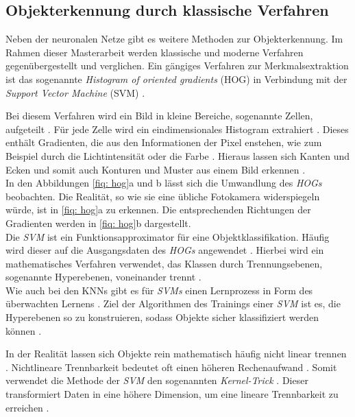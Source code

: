 	
		\subsection{Objekterkennung durch klassische Verfahren}
		\label{subsec: Objekterkennung durch alternative Verfahren}	
		
		
		Neben der neuronalen Netze gibt es weitere Methoden zur Objekterkennung. Im Rahmen dieser Masterarbeit werden klassische und moderne Verfahren gegenübergestellt und verglichen. Ein gängiges Verfahren zur Merkmalsextraktion ist das sogenannte \textit{Histogram of oriented gradients} (HOG) in Verbindung mit der \textit{Support Vector Machine} (SVM) \cite{hogsvm}.\newpage
		
		Bei diesem Verfahren wird ein Bild in kleine Bereiche, sogenannte Zellen, aufgeteilt \cite{hogsvm}. Für jede Zelle wird ein eindimensionales Histogram extrahiert \cite{hogsvm}. Dieses enthält Gradienten, die aus den Informationen der Pixel enstehen, wie zum Beispiel durch die Lichtintensität oder die Farbe \cite{hogsvm}. Hieraus lassen sich Kanten und Ecken und somit auch Konturen und Muster aus einem Bild erkennen \cite{hogsvm}.\\
		
		In den Abbildungen \ref{fiq: hog}a und b lässt sich die Umwandlung des \textit{HOGs} beobachten. Die Realität, so wie sie eine übliche Fotokamera widerspiegeln würde, ist in \ref{fiq: hog}a zu erkennen. Die entsprechenden Richtungen der Gradienten werden in \ref{fiq: hog}b dargestellt. \\
		
		
		
		Die \textit{SVM} ist ein Funktionsapproximator für eine Objektklassifikation. Häufig wird dieser auf die Ausgangsdaten des \textit{HOGs} angewendet \cite{hogsvm}. Hierbei wird ein mathematisches Verfahren verwendet, das Klassen durch Trennungsebenen, sogenannte Hyperebenen, voneinander trennt \cite{svmalt}.\\
		
		Wie auch bei den KNNs gibt es für \textit{SVMs} einen Lernprozess in Form des überwachten Lernens \cite{svmalt}. Ziel der Algorithmen des Trainings einer \textit{SVM} ist es, die Hyperebenen so zu konstruieren, sodass Objekte sicher klassifiziert werden können \cite{svmalt}.\newpage
		
		In der Realität lassen sich Objekte rein mathematisch häufig nicht linear trennen \cite{svmalt}. Nichtlineare Trennbarkeit bedeutet oft einen höheren Rechenaufwand \cite{svmalt}. Somit verwendet die Methode der \textit{SVM} den sogenannten \textit{Kernel-Trick} \cite{svmalt}. Dieser transformiert Daten in eine höhere Dimension, um eine lineare Trennbarkeit zu erreichen \cite{svmalt}.\\
		
